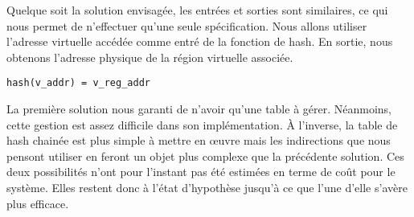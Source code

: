       Quelque soit la solution envisagée, les entrées et sorties sont
      similaires, ce qui nous permet de n'effectuer qu'une seule
      spécification. Nous allons utiliser l'adresse virtuelle accédée comme
      entré de la fonction de hash. En sortie, nous obtenons l'adresse physique
      de la région virtuelle associée.

      \begin{center}
        \texttt{hash(v\_addr) = v\_reg\_addr}
      \end{center}

      La première solution nous garanti de n'avoir qu'une table à
      gérer. Néanmoins, cette gestion est assez difficile dans son
      implémentation. À l'inverse, la table de hash chainée est plus simple à
      mettre en \oe uvre mais les indirections que nous pensont utiliser en
      feront un objet plus complexe que la précédente solution. Ces deux
      possibilités n'ont pour l'instant pas été estimées en terme de coût pour
      le système. Elles restent donc à l'état d'hypothèse jusqu'à ce que l'une
      d'elle s'avère plus efficace.





